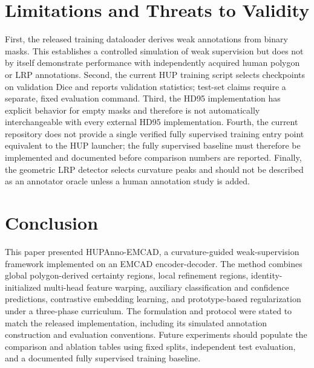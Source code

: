 \documentclass[journal]{IEEEtran}
\begin{document}
\section{Limitations and Threats to Validity}
First, the released training dataloader derives weak annotations from binary masks. This establishes a controlled simulation of weak supervision but does not by itself demonstrate performance with independently acquired human polygon or LRP annotations. Second, the current HUP training script selects checkpoints on validation Dice and reports validation statistics; test-set claims require a separate, fixed evaluation command. Third, the HD95 implementation has explicit behavior for empty masks and therefore is not automatically interchangeable with every external HD95 implementation. Fourth, the current repository does not provide a single verified fully supervised training entry point equivalent to the HUP launcher; the fully supervised baseline must therefore be implemented and documented before comparison numbers are reported. Finally, the geometric LRP detector selects curvature peaks and should not be described as an annotator oracle unless a human annotation study is added.

\section{Conclusion}
This paper presented HUPAnno-EMCAD, a curvature-guided weak-supervision framework implemented on an EMCAD encoder-decoder. The method combines global polygon-derived certainty regions, local refinement regions, identity-initialized multi-head feature warping, auxiliary classification and confidence predictions, contrastive embedding learning, and prototype-based regularization under a three-phase curriculum. The formulation and protocol were stated to match the released implementation, including its simulated annotation construction and evaluation conventions. Future experiments should populate the comparison and ablation tables using fixed splits, independent test evaluation, and a documented fully supervised training baseline.
\end{document}

